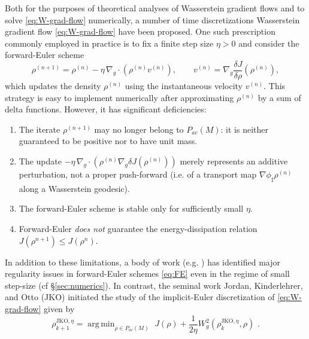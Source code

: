 \documentclass[reqno,11pt,letterpaper]{amsart}
\theoremstyle{plain}
\theoremstyle{definition}
\theoremstyle{remark}
\DeclareMathOperator*{\argmin}{arg\,min}
\begin{document}
Both for the purposes of theoretical analyses of Wasserstein gradient flows and to solve \eqref{eq:W-grad-flow} numerically, a number of time discretizations
Wasserstein gradient flow \eqref{eq:W-grad-flow} have been proposed. One such prescription commonly employed in practice is to fix a finite step size $\eta >0$ and consider the forward-Euler scheme
\begin{equation}\label{eq:FE}
    \rho^{(n+1)} = \rho^{(n)} - \eta \,\nabla_{g} \cdot ( \rho^{(n)} v^{(n)} ),\qquad v^{(n)} =  \nabla_{g} \frac{\delta J}{\delta \rho} (\rho^{(n)}),
\end{equation}
which updates the density $\rho^{(n)}$ using the instantaneous velocity $v^{(n)}$. This strategy is easy to implement numerically after approximating $\rho^{(n)}$ by a sum of delta functions. However, it has significant deficiencies:
\begin{enumerate}
    \item The iterate $\rho^{(n+1)}$ may no longer belong to $P_{ac}(M)$: it is neither guaranteed to be positive nor to have unit mass.
    \item The update $- \eta \,\nabla_{g} \cdot ( \rho^{(n)} \nabla_{g} \delta J (\rho^{(n)}) )$ merely represents an additive perturbation, not a proper push-forward (i.e. of a transport map $\nabla\phi_{\sharp} \rho^{(n)}$ along a Wasserstein geodesic).
    \item The forward-Euler scheme is stable only for sufficiently small $\eta$.
    \item Forward-Euler \textit{does not} guarantee the energy-dissipation relation $J(\rho^{n+1}) \leq J(\rho^{n})$.
\end{enumerate} 
In addition to these limitations, a body of work (e.g. \cite{FE_Bad}) has identified major regularity issues in forward-Euler schemes \eqref{eq:FE} even in the regime of small step-size (cf \S \ref{sec:numerics}). In contrast, the seminal work Jordan, Kinderlehrer, and Otto (JKO) \cite{Jordan1998} initiated the study of the implicit-Euler discretization of \eqref{eq:W-grad-flow} given by
\begin{equation}\label{eq:JKO}
    \rho_{k+1}^{\mathrm{JKO}, \eta} =
    \argmin_{\rho \in P_{ac}(M)} \,\, J(\rho) + \frac{1}{2\eta} W_{g}^{2}(\rho_k^{\mathrm{JKO}, \eta}, \rho) \,\, .
\end{equation}
\end{document}
